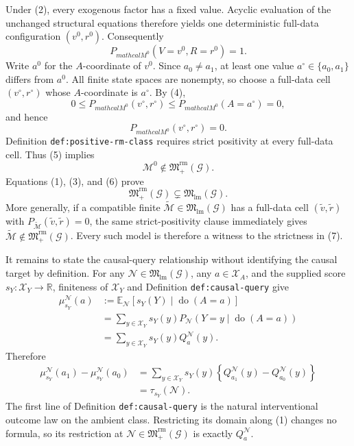 Under (2), every exogenous factor has a fixed value.  Acyclic evaluation of the unchanged structural equations therefore yields one deterministic full-data configuration \((v^0,r^0)\).  Consequently
\[
P_{mathcal M^0}(V=v^0,R=r^0)=1.
\tag{4}
\]
Write \(a^0\) for the \(A\)-coordinate of \(v^0\).  Since \(a_0\ne a_1\), at least one value \(a^\circ\in\{a_0,a_1\}\) differs from \(a^0\).  All finite state spaces are nonempty, so choose a full-data cell \((v^\circ,r^\circ)\) whose \(A\)-coordinate is \(a^\circ\).  By (4),
\[
0\le P_{mathcal M^0}(v^\circ,r^\circ)
\le P_{mathcal M^0}(A=a^\circ)=0,
\]
and hence
\[
P_{mathcal M^0}(v^\circ,r^\circ)=0.
\tag{5}
\]
Definition \texttt{def:positive-rm-class} requires strict positivity at every full-data cell.  Thus (5) implies
\[
\mathcal M^0\notin\mathfrak M_{+}^{\mathrm{rm}}(\mathcal G).
\tag{6}
\]
Equations (1), (3), and (6) prove
\[
\mathfrak M_{+}^{\mathrm{rm}}(\mathcal G)
\subsetneq
\mathfrak M_{\mathrm{lm}}(\mathcal G).
\tag{7}
\]
More generally, if a compatible finite \(\widetilde{\mathcal M}\in\mathfrak M_{\mathrm{lm}}(\mathcal G)\) has a full-data cell \((\widetilde v,\widetilde r)\) with \(P_{\widetilde{\mathcal M}}(\widetilde v,\widetilde r)=0\), the same strict-positivity clause immediately gives \(\widetilde{\mathcal M}\notin\mathfrak M_{+}^{\mathrm{rm}}(\mathcal G)\).  Every such model is therefore a witness to the strictness in (7).

It remains to state the causal-query relationship without identifying the causal target by definition.  For any \(\mathcal N\in\mathfrak M_{\mathrm{lm}}(\mathcal G)\), any \(a\in\mathcal X_A\), and the supplied score \(s_Y:\mathcal X_Y\to\mathbb R\), finiteness of \(\mathcal X_Y\) and Definition \texttt{def:causal-query} give
\[
\begin{aligned}
\mu_{s_Y}^{\mathcal N}(a)
&:=\mathbb E_{\mathcal N}\!\left[s_Y(Y)\mid\operatorname{do}(A=a)\right]\\
&=\sum_{y\in\mathcal X_Y}s_Y(y)
P_{\mathcal N}\!\left(Y=y\mid\operatorname{do}(A=a)\right)\\
&=\sum_{y\in\mathcal X_Y}s_Y(y)Q_a^{\mathcal N}(y).
\end{aligned}
\tag{8}
\]
Therefore
\[
\begin{aligned}
\mu_{s_Y}^{\mathcal N}(a_1)-\mu_{s_Y}^{\mathcal N}(a_0)
&=\sum_{y\in\mathcal X_Y}s_Y(y)
\left\{Q_{a_1}^{\mathcal N}(y)-Q_{a_0}^{\mathcal N}(y)\right\}\\
&=\tau_{s_Y}(\mathcal N).
\end{aligned}
\tag{9}
\]
The first line of Definition \texttt{def:causal-query} is the natural interventional outcome law on the ambient class.  Restricting its domain along (1) changes no formula, so its restriction at \(\mathcal N\in\mathfrak M_{+}^{\mathrm{rm}}(\mathcal G)\) is exactly \(Q_a^{\mathcal N}\).

